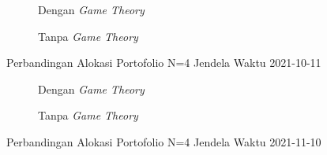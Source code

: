 %         
% 
% 
%         
% 
% 

\begin{figure}[!htbp]
    \centering
    \begin{subfigure}[b]{0.48\textwidth}
        \centering
        


        \caption{Dengan \textit{Game Theory}}
    \end{subfigure}
    \hfill
    \begin{subfigure}[b]{0.48\textwidth}
        \centering
        


        \caption{Tanpa \textit{Game Theory}}
    \end{subfigure}
    \caption{Perbandingan Alokasi Portofolio N=4 Jendela Waktu 2021-10-11}
    \label{fig:window_n4_2021_10_11}
\end{figure}

\begin{figure}[!htbp]
    \centering
    \begin{subfigure}[b]{0.48\textwidth}
        \centering
        


        \caption{Dengan \textit{Game Theory}}
    \end{subfigure}
    \hfill
    \begin{subfigure}[b]{0.48\textwidth}
        \centering
        


        \caption{Tanpa \textit{Game Theory}}
    \end{subfigure}
    \caption{Perbandingan Alokasi Portofolio N=4 Jendela Waktu 2021-11-10}
    \label{fig:window_n4_2021_11_10}
\end{figure}

